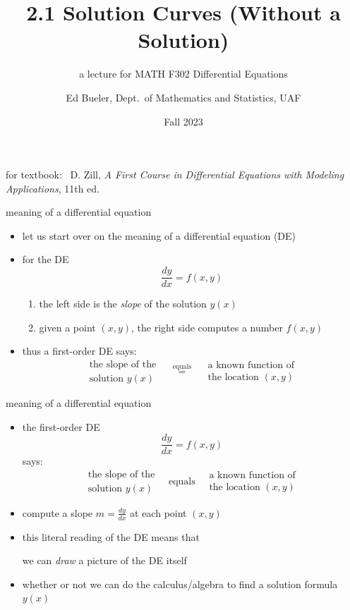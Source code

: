 \documentclass[colorlinks]{beamer}
\title{2.1 Solution Curves (Without a Solution)}
\subtitle{a lecture for MATH F302 Differential Equations}
\author{Ed Bueler, Dept.~of Mathematics and Statistics, UAF}
\date{Fall 2023}
\begin{document}


\begin{frame}
\titlepage

\centerline{\tiny for textbook: \, D. Zill, \emph{A First Course in Differential Equations with Modeling Applications}, 11th ed.}
\end{frame}


\begin{frame}{meaning of a differential equation}

\begin{itemize}
\item let us start over on the meaning of a differential equation (DE)
\item for the DE
    $$\frac{dy}{dx} = f(x,y)$$

\vspace{-2mm}
    \begin{enumerate}
    \item the left side is the \emph{slope} of the solution $y(x)$
    \item given a point $(x,y)$, the right side computes a number $f(x,y)$
    \end{enumerate}
\item thus a first-order DE says:
    $$\begin{matrix}
    \text{the slope of the} \\
    \text{solution } y(x) 
    \end{matrix} \quad \stackrel{\text{equals}}{=} \quad
    \begin{matrix}
    \text{a known function of} \\
    \text{the location } (x,y)
    \end{matrix}$$
\end{itemize}
\end{frame}


\begin{frame}{meaning of a differential equation}

\begin{itemize}
\item the first-order DE
    $$\frac{dy}{dx} = f(x,y)$$
says:
    $$\boxed{\begin{matrix}
    \text{the slope of the} \\
    \text{solution } y(x) 
    \end{matrix} \quad \text{equals} \quad
    \begin{matrix}
    \text{a known function of} \\
    \text{the location } (x,y)
    \end{matrix}}$$
\item compute a slope $m=\frac{dy}{dx}$ at each point $(x,y)$
\item this literal reading of the DE means that

\centerline{\alert{we can \emph{draw} a picture of the DE itself}}

\item whether or not we can do the calculus/algebra to find a solution formula $y(x)$
\end{itemize}
\end{frame}
\end{document}
